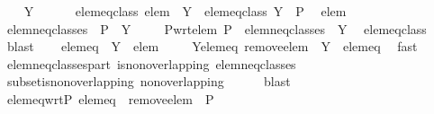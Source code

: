 \begin{isabellebody}
\ \ \isamarkupfalse%
\ Y\ \isanewline
\ \ \ \ \ elem{\isacharunderscore}eq{\isacharunderscore}class{\isacharcolon}\ {\isachardoublequoteopen}elem\ {\isasymin}\ Y{\isachardoublequoteclose}\ \ elem{\isacharunderscore}eq{\isacharunderscore}class{\isacharprime}{\isacharcolon}\ {\isachardoublequoteopen}Y\ {\isasymin}\ P{\isachardoublequoteclose}\ \isamarkupfalse%
\ elem\ \isacommand{{\isachardot}{\isachardot}}\isamarkupfalse%
\isanewline
\ \ \isamarkupfalse%
\ {\isacharquery}elem{\isacharunderscore}neq{\isacharunderscore}classes\ {\isacharequal}\ {\isachardoublequoteopen}P\ {\isacharminus}\ {\isacharbraceleft}Y{\isacharbraceright}{\isachardoublequoteclose}\ \isanewline
\ \ \isamarkupfalse%
\ P{\isacharunderscore}wrt{\isacharunderscore}elem{\isacharcolon}\ {\isachardoublequoteopen}P\ {\isacharequal}\ {\isacharquery}elem{\isacharunderscore}neq{\isacharunderscore}classes\ {\isasymunion}\ {\isacharbraceleft}Y{\isacharbraceright}{\isachardoublequoteclose}\ \isamarkupfalse%
\ elem{\isacharunderscore}eq{\isacharunderscore}class{\isacharprime}\ \isamarkupfalse%
\ blast\isanewline
\ \ \isamarkupfalse%
\ {\isacharquery}elem{\isacharunderscore}eq\ {\isacharequal}\ {\isachardoublequoteopen}Y\ {\isacharminus}\ {\isacharbraceleft}elem{\isacharbraceright}{\isachardoublequoteclose}\ \isanewline
\ \ \isamarkupfalse%
\ Y{\isacharunderscore}elem{\isacharunderscore}eq{\isacharcolon}\ {\isachardoublequoteopen}{\isacharquery}remove{\isacharunderscore}elem\ {\isacharbackquote}\ {\isacharbraceleft}Y{\isacharbraceright}\ {\isacharequal}\ {\isacharbraceleft}{\isacharquery}elem{\isacharunderscore}eq{\isacharbraceright}{\isachardoublequoteclose}\ \isamarkupfalse%
\ fast\isanewline
\ \ \isanewline
\ \ \isamarkupfalse%
\ elem{\isacharunderscore}neq{\isacharunderscore}classes{\isacharunderscore}part{\isacharcolon}\ {\isachardoublequoteopen}is{\isacharunderscore}non{\isacharunderscore}overlapping\ {\isacharquery}elem{\isacharunderscore}neq{\isacharunderscore}classes{\isachardoublequoteclose}\isanewline
\ \ \ \ \isamarkupfalse%
\ subset{\isacharunderscore}is{\isacharunderscore}non{\isacharunderscore}overlapping\ non{\isacharunderscore}overlapping\isanewline
\ \ \ \ \isamarkupfalse%
\ blast\isanewline
\ \ \isamarkupfalse%
\ elem{\isacharunderscore}eq{\isacharunderscore}wrt{\isacharunderscore}P{\isacharcolon}\ {\isachardoublequoteopen}{\isacharquery}elem{\isacharunderscore}eq\ {\isasymin}\ {\isacharquery}remove{\isacharunderscore}elem\ {\isacharbackquote}\ P{\isachardoublequoteclose}\ \isamarkupfalse%

\end{isabellebody}
